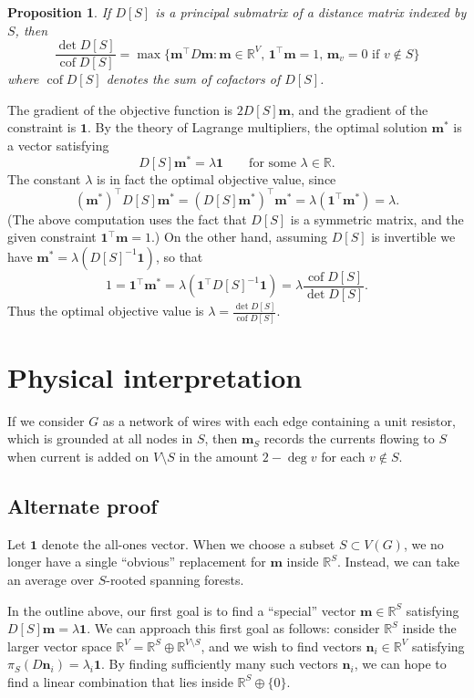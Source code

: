 \documentclass{amsart}
\newtheorem{prop}[thm]{Proposition}
\theoremstyle{definition}
\newcommand{\RR}{\mathbb{R}}
\newcommand{\bone}{\mathbf{1}}
\newcommand{\boldm}{\mathbf{m}}
\newcommand{\tr}{\intercal}
\DeclareMathOperator{\cof}{cof}
\begin{document}
\begin{prop}
If $D[S]$ is a principal submatrix of a distance matrix indexed by $S$, then 
\[
	\frac{\det D[S]}{\cof D[S]} = \max \{\boldm^\tr D \boldm : \boldm \in \RR^V,\, \bone^\tr \boldm = 1,\, \boldm_v = 0 \text{ if } v \not\in S \}
\]
where $\cof D[S]$ denotes the sum of cofactors of $D[S]$.
\end{prop}

The gradient of the objective function is $2 D[S] \boldm$, 
and the gradient of the constraint is $\bone$.
By the theory of Lagrange multipliers, the optimal solution $\boldm^*$ is a vector satisfying
\[
	D[S] \boldm^* = \lambda \bone \qquad\text{for some }\lambda \in \RR.
\]
The constant $\lambda$ is in fact the optimal objective value, since
\[
	(\boldm^*)^\tr D[S] \boldm^* = (D[S] \boldm^*)^\tr \boldm^* = \lambda (\bone^\tr \boldm^*) = \lambda.
\]
(The above computation uses the fact that $D[S]$ is a symmetric matrix, and the given constraint $\bone^\tr \boldm = 1$.)
On the other hand,
assuming $D[S]$ is invertible we have $ \boldm^* = \lambda (D[S]^{-1} \bone) $, so that
\[
	1 = \bone^\tr \boldm^* = \lambda (\bone^\tr D[S]^{-1} \bone)
	= \lambda \frac{\cof D[S]}{\det D[S]}.
\]
Thus the optimal objective value is
$\displaystyle
	\lambda = \frac{\det D[S]}{\cof D[S]} .
$

\section{Physical interpretation}

If we consider $G$ as a network of wires with each edge containing a unit resistor,
which is grounded at all nodes in $S$,
then $\boldm_S$ records the currents flowing to $S$
when current is added on $V\setminus S$ in the amount $2 - \deg v$
for each $v\not\in S$.

\subsection{Alternate proof}

Let $\mathbf{1}$ denote the all-ones vector.
When we choose a subset $S \subset V(G)$, we no longer have a single ``obvious'' replacement for $\boldm$ inside $\RR^S$.
Instead, we can take an average over $S$-rooted spanning forests.

In the outline above, our first goal is to find a ``special'' vector $ \boldm\in \RR^S$ satisfying $D[S] \boldm = \lambda \mathbf{1}$.
We can approach this first goal as follows: 
consider $\RR^S$ inside the larger vector space $\RR^V = \RR^S \oplus \RR^{V\setminus S}$,
and we wish to find vectors $\mathbf{n}_i \in \RR^{V}$ satisfying
$\pi_S( D \mathbf{n}_i) = \lambda_i \mathbf{1}$.
By finding sufficiently many such vectors $\mathbf{n}_i$,
we can hope to find a linear combination that lies inside $\RR^S \oplus \{0\}$.
\end{document}
